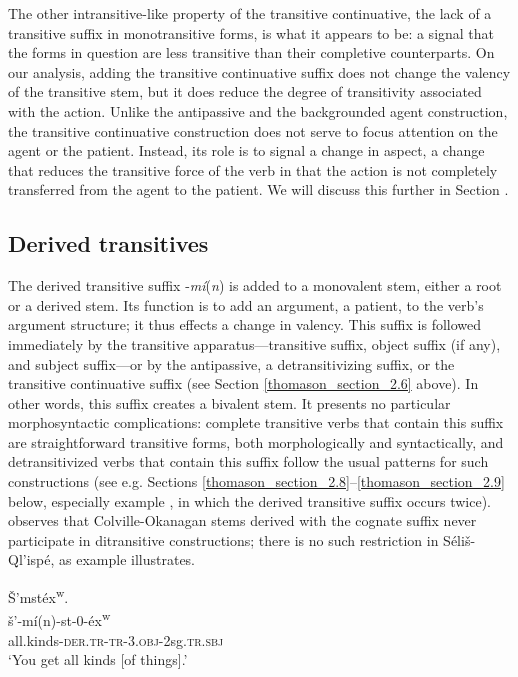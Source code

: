 \documentclass[output=paper,colorlinks,citecolor=brown]{langscibook}
\begin{document}
The other intransitive-like property of the transitive continuative,
the lack of a transitive suffix in monotransitive forms, is what it
appears to be: a signal that the forms in question are less transitive
than their completive counterparts.  On our analysis, adding the
transitive continuative suffix does not change the valency of the
transitive stem, but it does reduce the degree of transitivity
associated with the action.  Unlike the antipassive and the
backgrounded agent construction, the transitive continuative
construction does not serve to focus attention on the agent or the
patient.  Instead, its role is to signal a change in aspect, a change
that reduces the transitive force of the verb in that the action is
not completely transferred from the agent to the patient.  We will
discuss this further in Section .

\subsection{Derived transitives}  %
\label{thomason_section_2.7}

The derived transitive suffix -\emph{m\'i}(\emph{n}) is added to a
monovalent stem, either a root or a derived stem.  Its function is to
add an argument, a patient, to the verb's argument structure; it thus
effects a change in valency.  This suffix is followed immediately by
the transitive apparatus---transitive suffix, object suffix (if
any), and subject suffix---or by the antipassive, a detransitivizing
suffix, or the transitive continuative suffix (see Section \ref{thomason_section_2.6} above).
In other words, this suffix creates a bivalent stem.  It presents no
particular morphosyntactic complications: complete transitive verbs
that contain this suffix are straightforward transitive forms, both
morphologically and syntactically, and detransitivized verbs that
contain this suffix follow the usual patterns for such constructions
(see e.g. Sections \ref{thomason_section_2.8}--\ref{thomason_section_2.9} below, especially example , in which the derived
transitive suffix occurs twice).  \citet[430]{Mattina:1982} observes that
Colville-Okanagan stems derived with the cognate suffix never
participate in ditransitive constructions; there is no such
restriction in S\'eli\v{s}-Ql'isp\'e, as example  illustrates.

\ea
\label{ex-thomason-30}
\v{S}{\textcrlambda}'mst\'ex\textsuperscript w. \\
\gll \v{s}{\textcrlambda}'-m\'i(n)-st-0-\'e{x\textsuperscript w} \\
all.kinds-\textsc{der.tr}-\textsc{tr}-3.\textsc{obj}-2sg.\textsc{tr.sbj} \\
\glt `You get all kinds [of things].'
\z
\end{document}
